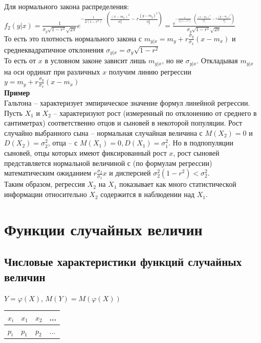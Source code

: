 \documentclass[russian, 12pt, fleqn]{article}
\begin{document}
\\
Для нормального закона распределения: $f_2(y|x) = \frac{1}{\sigma_y \sqrt{1 - r^2} \sqrt{2\pi}} \displaystyle{  e^{{-\frac{1}{2(1-r^2)}\cdot \left(\frac{(x-m_x)^2}{\sigma_x^2}  -r \frac{(y-m_y)^2}{\sigma_y^2}\right)}}  	}= \displaystyle{  \frac{  e^{{-\frac{1}{2(1-r^2)}\cdot \left (\frac{(x-m_x)^2}{\sigma_x^2}  -r \frac{(y-m_y)^2}{\sigma_y^2}\right )}} }{\sigma_y \sqrt{1 - r^2} \sqrt{2\pi}}}$\\
То есть это плотность нормального закона с $m_{y|x} = m_y + r \frac{\sigma_y}{\sigma_x} (x - m_x)$  и среднеквадратичное отклонения $\sigma_{y|x} = \sigma_{y} \sqrt{1-r^2}$ \\
То есть от $x$ в условном законе зависит лишь $m_{y|x}$, но не $\sigma_{y|x}$. Откладывая  $m_{y|x}$ на оси ординат при различных $x$ получим линию регрессии $y=m_y + r\frac{\sigma_y}{\sigma_x}(x-m_x)$\\
\textbf{Пример}\\
Гальтона -- характеризует эмпирическое значение формул линейной регрессии. Пусть $X_1$ и $X_2$ -- характеризуют рост (измеренный по отклонению от среднего в сантиметрах) соответственно отцов и сыновей в некоторой популяции. Рост случайно выбранного сына -- нормальная случайная величина с $M(X_2) = 0$ и $D(X_2) = \sigma_2^2$,
отца -- с $M(X_1) = 0, D(X_1) = \sigma_1^2$. Но в подпопуляции сыновей, отцы которых имеют фиксированный рост $x$, рост сыновей представляется нормальной величиной с (по формулам регрессии) математическим ожиданием  $r\frac{\sigma_2}{\sigma_1} x$ и дисперсией $\sigma_2^2(1-r^2) < \sigma_2^2$.\\
Таким образом, регрессия $X_2$ на $X_1$ показывает как много статистической информации относительно $X_2$ содержится в наблюдении над $X_1$.\\
\section{Функции случайных величин}
\subsection{Числовые характеристики функций случайных величин}
\noindent

$Y = \varphi(X)$, $M(Y) = M(\varphi(X))$\\

\begin{tabular}[b]{ | l | l |  l | l | }
\hline
$x_i$&$x_1$&$x_2$&...\\
\hline
$p_i$&$p_1$&$p_2$&...\\
\hline
\end{tabular}\\
\end{document}

